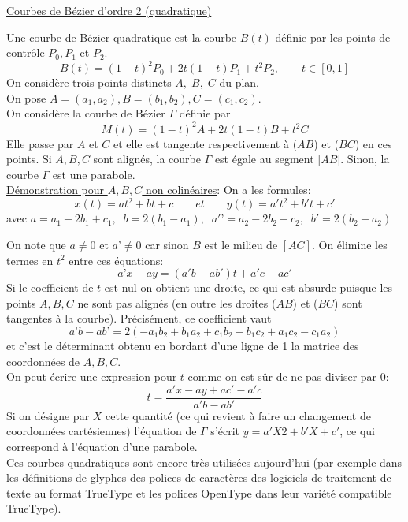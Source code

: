 \documentclass{article}
\begin{document}
\newpage
\begingroup\raggedleft
\underline{Courbes de B\'{e}zier d'ordre 2 (quadratique)}
\endgroup
\par
Une courbe de B\'{e}zier quadratique est la courbe $B(t)$ d\'{e}finie par les points de contr\^{o}le $P_0, P_1$ et $P_2.$
\[B(t) = (1-t)^2 P_0 + 2t (1-t) P_1 + t^2 P_2 , \qquad t \in [0,1]\]
On consid\`{e}re trois points distincts $A, \; B, \; C$ du plan. 
\\
On pose $A = (a_1 , a_2 ), B = (b_1 , b_2 ), C = (c_1 , c_2 )$.
\\
On consid\`{e}re la courbe de B\'{e}zier $\Gamma$ d\'{e}finie par \[M(t) = (1-t)^2 A+ 2t(1-t)B + t^2C\]
Elle passe par $A$ et $C$ et elle est tangente respectivement \`{a} ($AB$) et ($BC$) en ces points. Si $A, B, C$ sont align\'{e}s, la courbe $\Gamma$ est \'{e}gale au segment [$AB$]. Sinon, la courbe $\Gamma$ est une parabole.
\\[10pt]
\underline{D\'{e}monstration pour $A, B, C$ non colin\'{e}aires}:
On a les formules:
\[x(t) = at^2 + bt + c \qquad et \qquad y(t) = a' t^2 + b't + c'\]
avec $a = a_1-2b_1 + c_1, \;\;  b = 2(b_1-a_1 ), \;\; a'’ = a_2-2b_2 + c_2, \;\; b' = 2(b_2-a_2 )$
\par
On note que $a \ne 0$ et $a’ \ne 0$ car sinon $B$ est le milieu de $[AC]$. 
On \'{e}limine les termes en $t^2$ entre ces \'{e}quations: 
\[a’x-ay = (a'b-ab')t + a'c-ac'\]
\indent
Si le coefficient de $t$ est nul on obtient une droite, ce qui est absurde puisque les points $A, B, C$ ne sont pas align\'{e}s (en outre les droites ($AB$) et ($BC$) sont tangentes \`{a} la courbe). Pr\'{e}cis\'{e}ment, ce coefficient vaut \[a’b-ab’ = 2(-a_1 b_2 + b_1 a_2 + c_1 b_2-b_1 c_2 + a_1 c_2-c_1 a_2 )\] 
et c'est le d\'{e}terminant obtenu en bordant d'une ligne de 1 la matrice des coordonn\'{e}es de $A, B, C$.
\\
On peut \'{e}crire une expression pour $t$ comme on est s\^{u}r de ne pas diviser par 0:
\[t = \frac{a'x-ay + ac'-a'c}{a'b-ab'}\]
\indent
Si on d\'{e}signe par $X$ cette quantit\'{e} (ce qui revient \`{a} faire un changement de coordonn\'{e}es
cart\'{e}siennes) l'\'{e}quation de $\Gamma$ s'\'{e}crit $y = a'X 2 + b'X + c'$, ce qui correspond \`{a} l'\'{e}quation d'une parabole.
\\
\indent
Ces courbes quadratiques sont encore tr\`{e}s utilis\'{e}es aujourd'hui (par exemple dans les d\'{e}finitions de glyphes des polices de caract\`{e}res des logiciels de traitement de texte au format TrueType et les polices OpenType dans leur vari\'{e}t\'{e} compatible TrueType).
\end{document}
